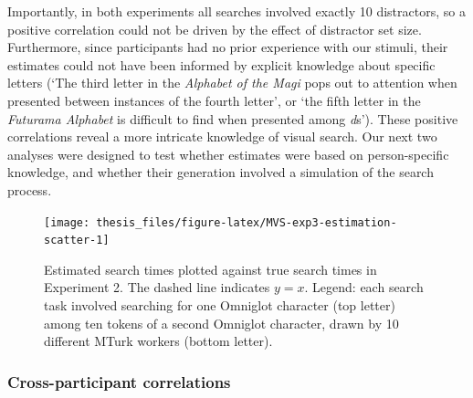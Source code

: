 \documentclass[12pt,twoside]{reedthesis}
\begin{document}
Importantly, in both experiments all searches involved exactly 10 distractors, so a positive correlation could not be driven by the effect of distractor set size. Furthermore, since participants had no prior experience with our stimuli, their estimates could not have been informed by explicit knowledge about specific letters (`The third letter in the \emph{Alphabet of the Magi} pops out to attention when presented between instances of the fourth letter', or `the fifth letter in the \emph{Futurama Alphabet} is difficult to find when presented among \emph{d}s'). These positive correlations reveal a more intricate knowledge of visual search. Our next two analyses were designed to test whether estimates were based on person-specific knowledge, and whether their generation involved a simulation of the search process.
\begin{figure}
\texttt{[image: thesis\_files/figure-latex/MVS-exp3-estimation-scatter-1]} \caption[Search time estimates accuracy, Experiment 3]{Estimated search times plotted against true search times in Experiment 2. The dashed line indicates $y=x$. Legend: each search task involved searching for one Omniglot character (top letter) among ten tokens of a second Omniglot character, drawn by 10 different MTurk workers (bottom letter).}\label{fig:MVS-exp3-estimation-scatter}
\end{figure}
\hypertarget{selfself}{%
\subsubsection*{Cross-participant correlations}\label{selfself}}
\end{document}

